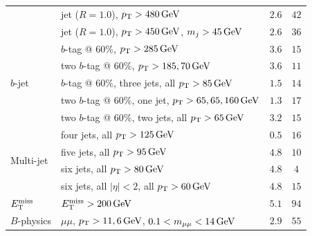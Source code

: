 \begin{table}[tp]
\begin{adjustbox}{width=\textwidth}
\begin{tabular}{llcc}
                               & jet ($R = 1.0$), $\pt > 480\,\eV[G]$                             & $2.6$                         & $42$                          \\
                               & jet ($R = 1.0$), $\pt > 450\,\eV[G]$, $m_j > 45\,\eV[G]$         & $2.6$                         & $36$                          \\
\hline
\multirow{5}{*}{$b$-jet}       & $b$-tag @ $60\%$, $\pt > 285\,\eV[G]$                            & $3.6$                         & $15$                          \\
                               & two $b$-tag @ $60\%$, $\pt > 185,70\,\eV[G]$                     & $3.6$                         & $11$                          \\
                               & $b$-tag @ $60\%$, three jets, all $\pt > 85\,\eV[G]$             & $1.5$                         & $14$                          \\
                               & two $b$-tag @ $60\%$, one jet, $\pt > 65, 65,160\,\eV[G]$        & $1.3$                         & $17$                          \\
                               & two $b$-tag @ $60\%$, two jets, all $\pt > 65\,\eV[G]$           & $3.2$                         & $15$                          \\
\hline
\multirow{4}{*}{Multi-jet}     & four jets, all $\pt > 125\,\eV[G]$                               & $0.5$                         & $16$                          \\
                               & five jets, all $\pt > 95\,\eV[G]$                                & $4.8$                         & $10$                          \\
                               & six jets, all $\pt > 80\,\eV[G]$                                 & $4.8$                         & $4$                           \\
                               & six jets, all $|\eta| < 2$, all $\pt > 60\,\eV[G]$               & $4.8$                         & $15$                          \\
\hline
$\met$                         & $\met > 200\,\eV[G]$                                             & $5.1$                         & $94$                          \\
\hline
\multirow{4}{*}{$B$-physics}   & $\mu\mu$, $\pt > 11, 6\,\eV[G]$, $0.1 < m_{\mu\mu} < 14\,\eV[G]$ & $2.9$                         & $55$                          \\

\end{tabular}
\end{adjustbox}
\end{table}
